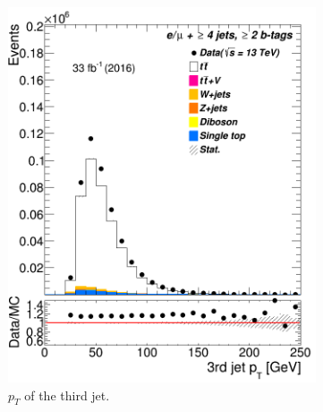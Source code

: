\begin{figure} [t]
	\begin{subfigure}{0.25\textwidth}
		\includegraphics[width=\linewidth]{ControlPlots_emujets_2016_4incl_2incl/jet2_pt_emujets_2016.png}
		\caption{$p_T$ of the third jet.} \label{fig:Sec27}
	\end{subfigure}\hspace*{0.5cm}
	\begin{subfigure}{0.25\textwidth}

\end{subfigure}
\end{figure}
